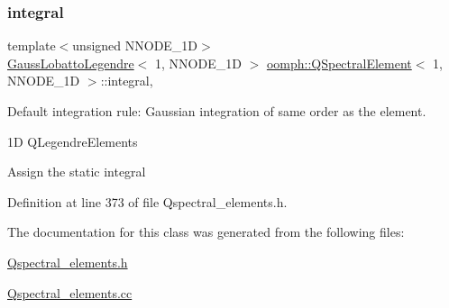 \subsubsection{\texorpdfstring{integral}{integral}}
{\footnotesize\ttfamily template$<$unsigned N\+N\+O\+D\+E\+\_\+1D$>$ \\
\hyperlink{classoomph_1_1GaussLobattoLegendre}{Gauss\+Lobatto\+Legendre}$<$ 1, N\+N\+O\+D\+E\+\_\+1D $>$ \hyperlink{classoomph_1_1QSpectralElement}{oomph\+::\+Q\+Spectral\+Element}$<$ 1, N\+N\+O\+D\+E\+\_\+1D $>$\+::integral\hspace{0.3cm}{\ttfamily [static]}, {\ttfamily [private]}}



Default integration rule\+: Gaussian integration of same \textquotesingle{}order\textquotesingle{} as the element. 

1D Q\+Legendre\+Elements

Assign the static integral 

Definition at line 373 of file Qspectral\+\_\+elements.\+h.



The documentation for this class was generated from the following files\+:\begin{DoxyCompactItemize}
\item 
\hyperlink{Qspectral__elements_8h}{Qspectral\+\_\+elements.\+h}\item 
\hyperlink{Qspectral__elements_8cc}{Qspectral\+\_\+elements.\+cc}\end{DoxyCompactItemize}
